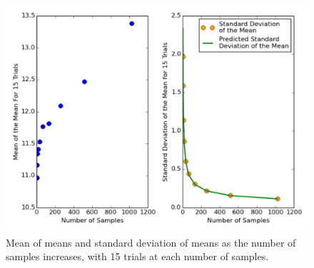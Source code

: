 \documentclass[a4paper,12pt]{article}
\begin{document}
\begin{figure}[ht]
\centering
\includegraphics[width=\linewidth]{section9_fix.pdf}
\caption{Mean of means and standard deviation of means as the number of samples increases, with 15 trials at each number of samples.}
\label{fig:section9}
\end{figure}



\end{document}
